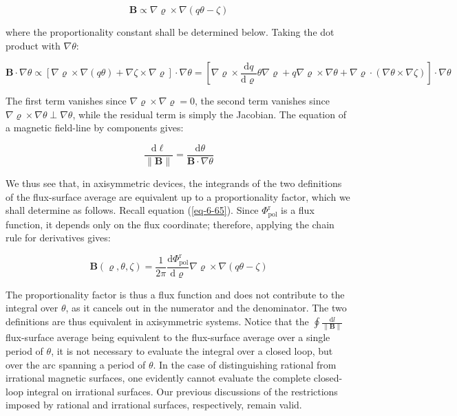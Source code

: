 \begin{equation}
    \mathbf{B}\propto\nabla\varrho\times\nabla(q\theta-\zeta)
\end{equation}

where the proportionality constant shall be determined below. Taking the dot product with $\nabla\theta$:

\begin{equation}
    \mathbf{B}\cdot\nabla\theta\propto\left[\nabla\varrho\times\nabla(q\theta)+\nabla\zeta\times\nabla\varrho\right]\cdot\nabla\theta=\left[\nabla\varrho\times\frac{\mathrm{d}q}{\mathrm{d}\varrho}\theta\nabla\varrho+q\nabla\varrho\times\nabla\theta+\nabla\varrho\cdot(\nabla\theta\times\nabla\zeta)\right]\cdot\nabla\theta
\end{equation}

The first term vanishes since $\nabla\varrho\times\nabla\varrho=0$, the second term vanishes since $\nabla\varrho\times\nabla\theta\perp\nabla\theta$, while the residual term is simply the Jacobian. The equation of a magnetic field-line by components gives:

\begin{equation}
    \frac{\mathrm{d}\ell}{\|\mathbf{B}\|}=\frac{\mathrm{d}\theta}{\mathbf{B}\cdot\nabla\theta}
\end{equation}

We thus see that, in axisymmetric devices, the integrands of the two definitions of the flux-surface average are equivalent up to a proportionality factor, which we shall determine as follows. Recall equation (\ref{eq-6-65}). Since $\Phi_\text{pol}^\text{r}$ is a flux function, it depends only on the flux coordinate; therefore, applying the chain rule for derivatives gives:

\begin{equation}
    \mathbf{B}(\varrho,\theta,\zeta)=\frac{1}{2\pi}\frac{\mathrm{d}\Phi_\text{pol}^\text{r}}{\mathrm{d}\varrho}\nabla\varrho\times\nabla(q\theta-\zeta)
\end{equation}

The proportionality factor is thus a flux function and does not contribute to the integral over $\theta$, as it cancels out in the numerator and the denominator. The two definitions are thus equivalent in axisymmetric systems. Notice that the $\oint\frac{\mathrm{d}l}{\|\mathbf{B}\|}$ flux-surface average being equivalent to the flux-surface average over a single period of $\theta$, it is not necessary to evaluate the integral over a closed loop, but over the arc spanning a period of $\theta$. In the case of distinguishing rational from irrational magnetic surfaces, one evidently cannot evaluate the complete closed-loop integral on irrational surfaces. Our previous discussions of the restrictions imposed by rational and irrational surfaces, respectively, remain valid.

